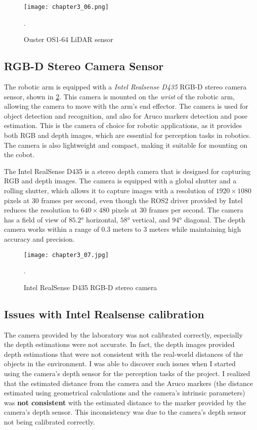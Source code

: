 \begin{figure}[t]
    \centering
    \texttt{[image: chapter3\_06.png]}
    \captionsetup{width=1\linewidth}
    \caption{Ouster OS1-64 LiDAR sensor}.
    \label{fig:c3_img06}
\end{figure}

\subsection{RGB-D Stereo Camera Sensor}

The robotic arm is equipped with a \textit{Intel Realsense D435} RGB-D stereo camera sensor, shown in \ref{fig:c3_img07}.
This camera is mounted on the \textit{wrist} of the robotic arm, allowing the camera to move with the arm's end effector.
The camera is used for object detection and recognition, and also for Aruco markers detection and pose estimation.
This is the camera of choice for robotic applications, as it provides both RGB and depth images, which are essential
for perception tasks in robotics. The camera is also lightweight and compact, making it suitable for mounting on the cobot.

The Intel RealSense D435 is a stereo depth camera that is designed for capturing RGB and depth images.
The camera is equipped with a global shutter and a rolling shutter, which allows it to capture images with a resolution
of $1920\times1080$ pixels at $30$ frames per second, even though the ROS2 driver provided by Intel reduces the resolution
to $640\times480$ pixels at $30$ frames per second. The camera has a field of view of $85.2$° horizontal, $58$° vertical,
and $94$° diagonal. The depth camera works within a range of $0.3$ meters to $3$ meters while maintaining 
high accuracy and precision.

\begin{figure}[t]
    \centering
    \texttt{[image: chapter3\_07.jpg]}
    \captionsetup{width=1\linewidth}
    \caption{Intel RealSense D435 RGB-D stereo camera}.
    \label{fig:c3_img07}
\end{figure}

\subsection{Issues with Intel Realsense calibration}

The camera provided by the laboratory was not calibrated correctly, especially the depth estimations were not accurate.
In fact, the depth images provided depth estimations that were not consistent with the real-world distances of the objects
in the environment. I was able to discover such issues when I started using the camera's depth sensor for the perception
tasks of the project. I realized that the estimated distance from the camera and the Aruco markers (the distance estimated
using geometrical calculations and the camera's intrinsic parameters) was \textbf{not consistent} with the estimated distance
to the marker provided by the camera's depth sensor. This inconsistency was due to the camera's depth sensor not being
calibrated correctly.

